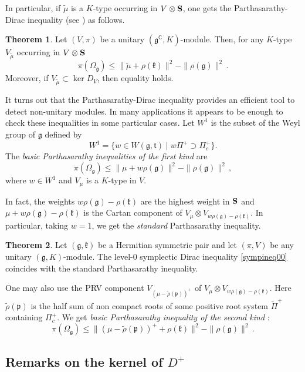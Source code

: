 \documentclass{amsart}[draft,11pt]
\newcommand{\mg}{\mathfrak{g}}
\newcommand{\mk}{\mathfrak{k}}
\newcommand{\fg}{{\mathfrak{g}}}
\newcommand{\fk}{{\mathfrak{k}}}
\newcommand{\fp}{{\mathfrak{p}}}
\numberwithin{equation}{section}
\theoremstyle{definition}
\newtheorem{theorem}{Theorem}[section]
\newtheorem{thm}[theorem]{Theorem}
\begin{document}
In particular, if $\tilde{\mu}$ is a $K$-type occurring in $V\otimes {\bf S}$, one gets the Parthasarathy-Dirac inequality (see \cite[Section 2]{P80}) as follows.
\begin{theorem}
Let $(V,\pi)$ be a unitary $(\fg^\mathbb{C},K)$-module. Then,
for any $K$-type $V_{\tilde{\mu}}$ occurring in $V\otimes {\bf S}$
\begin{equation}\label{parthadirac}
\pi(\Omega_\mg)\leq\|\tilde{\mu}+\rho(\mk)\|^2-\|\rho(\fg)\|^2 \,.
\end{equation}
Moreover, if $V_{\tilde{\mu}} \subset \ker D_V$, then equality holds.
\end{theorem}
It turns out that the Parthasarathy-Dirac inequality provides an efficient tool to detect non-unitary modules. In many applications it appears to be enough to check these inequalities in some 
particular cases. 
Let $W^1$ is the subset of the Weyl group of $\fg$
defined by
\[
W^1=\{w\in W(\fg,{\mathfrak t})\mid w\Pi^+\supset\Pi_c^+\}.
\]
The \emph{basic Parthasarathy inequalities of the first kind} are
$$
\pi(\Omega_\fg) \leq
\|\mu+w\rho(\fg)\|^2-\|\rho(\fg)\|^2\,,
$$
where $w\in W^1$
and  $V_\mu$ is a $K$-type in $V$.

In fact, the weights $w\rho(\fg)-\rho(\fk)$ are the highest weight in ${\bf S}$ and 
$\mu+w\rho(\fg)-\rho(\fk)$ is the Cartan component of $V_\mu\otimes V_{w\rho(\fg)-\rho(\fk)}$.
In particular, taking $w=1$, we get the \emph{standard} Parthasarathy inequality.
\begin{thm}\label{sympvspartha}
Let $(\fg,\fk)$ be a Hermitian symmetric pair and let $(\pi, V)$ be any unitary $(\fg,K)$-module. 
The level-$0$ symplectic Dirac inequality \eqref{sympineq00} coincides with the standard Parthasarathy inequality.
\end{thm}
One may also use the PRV component 
$V_{(\mu-\tilde{\rho}(\fp))^+}$
of $V_\mu\otimes V_{w\rho(\fg)-\rho(\fk)}$.
Here $\tilde{\rho}(\fp)$ is the half sum
of non compact roots of some positive root system
$\widetilde{\Pi}^+$ containing $\Pi^+_c$. We get {\it basic Parthasarathy inequality of the second kind} :
\begin{equation}
\label{prv-partha}
   \pi(\Omega_\fg) \leq \|(\mu-\tilde{\rho}(\fp))^++\rho(\fk)\|^2-\|\rho(\fg)\|^2 \,.
\end{equation}


\subsection{Remarks on the kernel of $D^+$}
\end{document}
